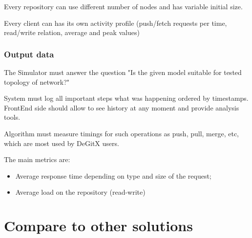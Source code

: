 \documentclass[12pt,oneside]{article}
\begin{document}
Every repository can use different number of nodes and has variable initial size.

Every client can has its own activity profile (push/fetch requests per time, read/write relation, average and peak values)

\subsubsection{Output data}
\label{sec:output}

The Simulator must answer the question "Is the given model suitable for tested topology of network?"

System must log all important steps what was happening ordered by timestamps. FrontEnd side should allow to see history at any moment and provide analysis tools.

Algorithm must measure timings for such operations as push,  pull, merge, etc, which are most used by DeGitX users.

The main metrics are:
\begin{itemize}
    \item Average response time depending on type and size of the request;
    \item Average load on the repository (read-write)
\end{itemize}

\section{Compare to other solutions}
\end{document}
